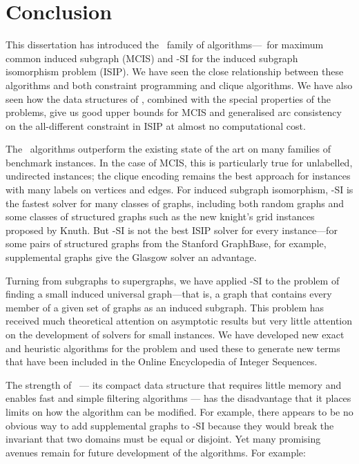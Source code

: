 \chapter{Conclusion}
\label{c:conclusion}

This dissertation has introduced the \McSplit\ family of algorithms---\McSplit\
for maximum common induced subgraph (MCIS) and \McSplit-SI for the induced
subgraph isomorphism problem (ISIP).  We have seen the close relationship
between these algorithms and both constraint programming and clique algorithms.
We have also seen how the data structures of \McSplit, combined with the
special properties of the problems, give us good upper bounds for MCIS and
generalised arc consistency on the all-different constraint in ISIP at almost
no computational cost.

The \McSplit\ algorithms outperform
the existing state of the art on many families of benchmark instances.  In the
case of MCIS, this is particularly true for unlabelled, undirected instances;
the clique encoding remains the best approach for instances with many labels on
vertices and edges.  For induced subgraph isomorphism, \McSplit-SI is the
fastest solver for many classes of graphs, including both random graphs and
some classes of structured graphs such as the new knight's grid instances
proposed by Knuth.  But
\McSplit-SI is not the best ISIP solver for every instance---for some pairs of
structured graphs from the Stanford GraphBase, for example,
supplemental graphs give the Glasgow solver an advantage.

Turning from subgraphs to supergraphs,
we have applied \McSplit-SI to the problem of finding a small induced universal
graph---that is, a graph that contains every member of a given set of graphs as
an induced subgraph. This problem has received much theoretical attention on
asymptotic results but very little attention on the development of solvers for
small instances.  We have developed new exact and heuristic algorithms for the
problem and used these to generate new terms that have been included in the
Online Encyclopedia of Integer Sequences.

The strength of \McSplit\ --- its compact data structure that requires little
memory and enables fast and simple filtering algorithms --- has the
disadvantage that it places limits on how the algorithm can be modified.  For example, there
appears to be no obvious way to add supplemental graphs to \McSplit-SI because
they would break the invariant that two domains must be equal or disjoint.  Yet
many promising avenues remain for future development of the
algorithms. For example:

